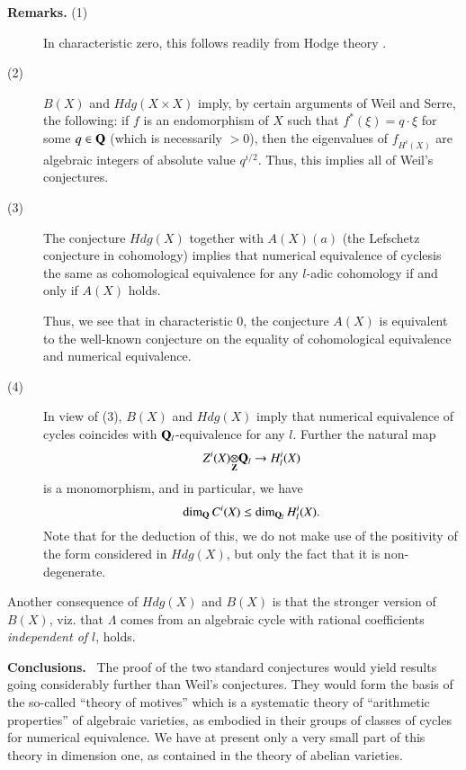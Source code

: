 \begin{description}
\item[{\bf Remarks.} {\rm(1)}] In characteristic zero, this follows readily from Hodge theory \cite{art09-key5}.

\item[\rm(2)] $B(X)$ and $Hdg(X\times X)$ imply, by certain arguments of Weil and Serre, the following: if $f$ is an endomorphism of $X$ such that $f^{*}(\xi)=q\cdot \xi$ for some $q\in \mathbf{Q}$ (which is necessarily $>0$), then the eigenvalues of $f_{H^{i}(X)}$ are algebraic integers of absolute value $q^{i/2}$. Thus, this implies all of Weil's conjectures.

\item[\rm(3)] The conjecture $Hdg(X)$ together with $A(X)(a)$ (the Lefschetz conjecture in cohomology) implies that numerical equivalence of cycles\pageoriginale is the same as cohomological equivalence for any $l$-adic cohomology if and only if $A(X)$ holds.

Thus, we see that in characteristic $0$, the conjecture $A(X)$ is equivalent to the well-known conjecture on the equality of cohomological equivalence and numerical equivalence.

\item[\rm(4)] In view of (3), $B(X)$ and $Hdg(X)$ imply that numerical equivalence of cycles coincides with $\mathbf{Q}_{l}$-equivalence for any $l$. Further the natural map
$$
\foprod{Z^{i}(X)}{\bfQ_{l}}{\bfZ}\to H^{i}_{l}(X)
$$
is a monomorphism, and in particular, we have
$$
\dim_{\mathbf{Q}}C^{i}(X)\leq \dim_{\mathbf{Q}_{l}}H^{i}_{l}(X).
$$
Note that for the deduction of this, we do not make use of the positivity of the form considered in $Hdg(X)$, but only the fact that it is non-degenerate.
\end{description}

Another consequence of $Hdg(X)$ and $B(X)$ is that the stronger version of $B(X)$, viz. that $\Lambda$ comes from an algebraic cycle with rational coefficients {\em independent of $l$}, holds.

\medskip
\noindent
{\bf Conclusions.}~ The proof of the two standard conjectures would yield results going considerably further than Weil's conjectures. They would form the basis of the so-called ``theory of motives'' which is a systematic theory of ``arithmetic properties'' of algebraic varieties, as embodied in their groups of classes of cycles for numerical equivalence. We have at present only a very small part of this theory in dimension one, as contained in the theory of abelian varieties.

